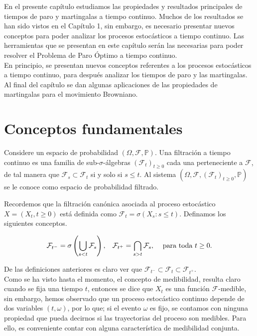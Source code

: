 En el presente capítulo estudiamos las propiedades y resultados principales de tiempos de paro y martingalas a tiempo continuo. Muchos de los resultados se han sido vistos en el Capítulo 1, sin embargo, es necesario presentar nuevos conceptos para poder analizar los procesos estocásticos a tiempo continuo. Las herramientas que se presentan en este capítulo serán las necesarias para poder resolver el Problema de Paro Óptimo a tiempo continuo. \\

En principio, se presentan nuevos conceptos referentes a los procesos estocásticos a tiempo continuo, para después analizar los tiempos de paro y las martingalas. Al final del capítulo se dan algunas aplicaciones de las propiedades de martingalas para el movimiento Browniano. 

\section{Conceptos fundamentales}

\begin{definition}
	Considere un espacio de probabilidad $(\Omega, \mathcal{F}, \mathbb{P})$. Una filtración a tiempo continuo es una familia de sub-$\sigma$-álgebras $(\mathcal{F}_t)_{t \geq 0}$ cada una perteneciente a $\mathcal{F}$, de tal manera que $\mathcal{F}_s \subset \mathcal{F}_t$ si y solo si $s \leq t$. Al sistema $(\Omega, \mathcal{F}, (\mathcal{F}_t)_{t \geq 0}, \mathbb{P})$ se le conoce como espacio de probabilidad filtrado.
\end{definition}

Recordemos que la filtración canónica asociada al proceso estocástico $X = (X_t, t \geq 0)$ está definida como $\mathcal{F}_t = \sigma(X_s : s \leq t)$. Definamos los siguientes conceptos.

\begin{align*}
	\mathcal{F}_{t^{-}} = \sigma \left( \bigcup_{s < t} \mathcal{F}_s \right), \hspace{0.3cm} \mathcal{F}_{t^{+}} = \bigcap_{s > t} \mathcal{F}_s, \hspace{0.3cm} \text{ para toda } t \geq 0.
\end{align*}

De las definiciones anteriores es claro ver que $\mathcal{F}_{t^{-}} \subset \mathcal{F}_t \subset \mathcal{F}_{t^{+}}$. \\

Como se ha visto hasta el momento, el concepto de medibilidad, resulta claro cuando se fija una tiempo $t$, entonces se dice que $X_t$ es una función $\mathcal{F}$-medible, sin embargo, hemos observado que un proceso estocástico continuo depende de dos variables $(t, \omega)$, por lo que; si el evento $\omega$ es fijo, se contamos con ninguna propiedad que pueda decirnos si las trayectorias del proceso son medibles. Para ello, es conveniente contar con alguna característica de medibilidad conjunta. \\

